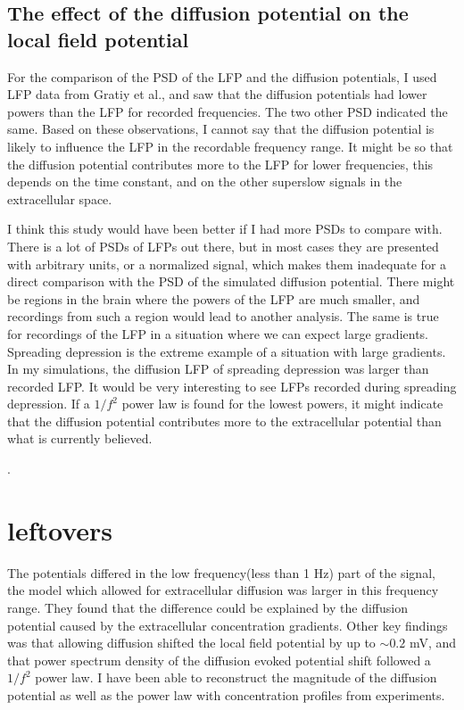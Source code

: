 \documentclass{article}
\begin{document}
\subsection{The effect of the diffusion potential on the local field potential}
For the comparison of the PSD of the LFP and the diffusion potentials, I used LFP data from Gratiy et al., and saw that the diffusion potentials had lower powers than the LFP for recorded frequencies. The two other PSD indicated the same. Based on these observations, I cannot say that the diffusion potential is likely to influence the LFP in the recordable frequency range. It might be so that the diffusion potential contributes more to the LFP for lower frequencies, this depends on the time constant, and on the other superslow signals in the extracellular space.

I think this study would have been better if I had more PSDs to compare with. There is a lot of PSDs of LFPs out there, but in most cases they are presented with arbitrary units, or a normalized signal, which makes them inadequate for a direct comparison with the PSD of the simulated diffusion potential. There might be regions in the brain where the powers of the LFP are much smaller, and recordings from such a region would lead to another analysis. The same is true for recordings of the LFP in a situation where we can expect large gradients. Spreading depression is the extreme  example of a situation with large gradients. In my simulations, the diffusion LFP of spreading depression was larger than recorded LFP. It would be very interesting to see LFPs recorded during spreading depression. If a $1/f^2$ power law is found for the lowest powers, it might indicate that the diffusion potential contributes more to the extracellular potential than what is currently believed. 

. 
\section{leftovers}


The potentials differed in the low frequency(less than 1 Hz) part of the signal, the model which allowed for extracellular diffusion was larger in this frequency range. They found that the difference could be explained by the diffusion potential caused by the extracellular concentration gradients. Other key findings was that allowing diffusion shifted the local field potential by up to $\sim 0.2$ mV, and that power spectrum density of the diffusion evoked potential shift followed a $1/f^2$ power law. I have been able to reconstruct the magnitude of the diffusion potential as well as the power law with concentration profiles from experiments. 
\end{document}
